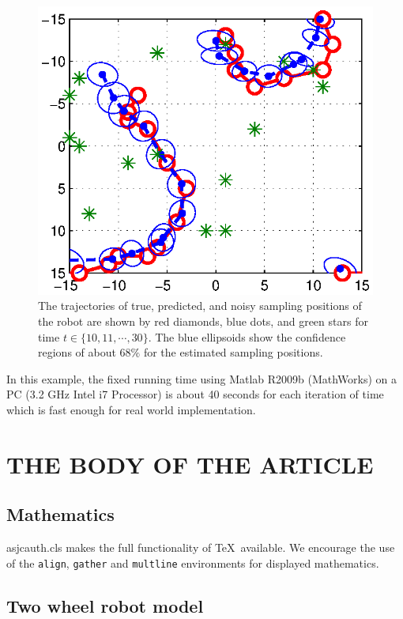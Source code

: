 \documentclass[letterpaper, 10 pt, conference]{ieeeconf}
\newcommand{\set}[1]{\{#1\}} \newcommand{\norm}[1]{\|#1\|}
\begin{document}
\begin{figure}[tb]\centering
 \includegraphics[trim = 0mm 5mm 0mm 2mm, width=0.95\columnwidth]{trajectory3.eps}
 \caption{The trajectories of true, predicted, and noisy sampling positions of the robot are shown by red diamonds, blue dots, and green stars for time $t \in \set{10,11, \cdots, 30}$. The blue ellipsoids show the confidence regions of about $68\%$ for the estimated sampling positions.}
 \label{fig:true}
\end{figure}

%
In this example, the fixed running time using Matlab R2009b (MathWorks) on a PC (3.2 GHz Intel i7 Processor) is about  {40} seconds for each iteration of time which is fast enough for real world implementation. 





\section{THE BODY OF THE ARTICLE}

\subsection{Mathematics} \textsf{asjcauth.cls} makes the full
functionality of \AmS\/\TeX\ available. We encourage the use of
the \verb"align", \verb"gather" and \verb"multline" environments
for displayed mathematics.

\subsection{Two wheel robot model}
\end{document}
